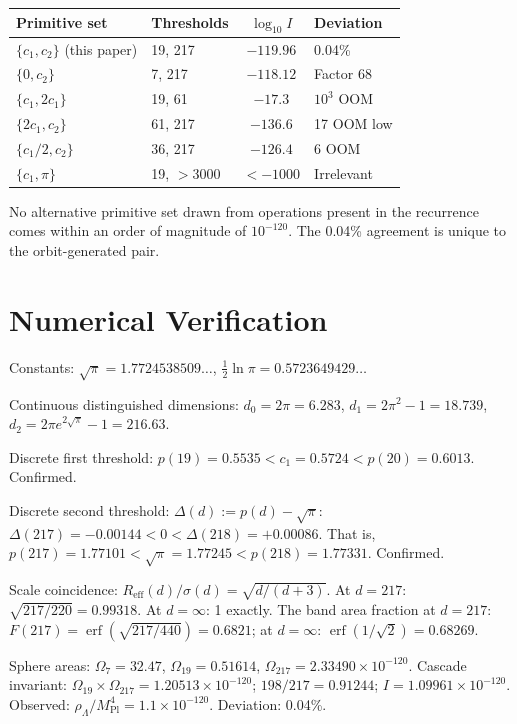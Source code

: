 \documentclass[11pt,a4paper]{article}
\begin{document}
\begin{center}
\begin{tabular}{llcl}
\toprule
Primitive set & Thresholds & $\log_{10} I$ & Deviation\\
\midrule
$\{c_1, c_2\}$ (this paper) & 19, 217 & $-119.96$ & 0.04\%\\
$\{0, c_2\}$ & 7, 217 & $-118.12$ & Factor 68\\
$\{c_1, 2c_1\}$ & 19, 61 & $-17.3$ & $10^3$ OOM\\
$\{2c_1, c_2\}$ & 61, 217 & $-136.6$ & 17 OOM low\\
$\{c_1/2, c_2\}$ & 36, 217 & $-126.4$ & 6 OOM\\
$\{c_1, \pi\}$ & 19, $>$3000 & $<-1000$ & Irrelevant\\
\bottomrule
\end{tabular}
\end{center}

No alternative primitive set drawn from operations present in the recurrence comes within an order of magnitude of $10^{-120}$. The 0.04\% agreement is unique to the orbit-generated pair.

\appendix

\section{Numerical Verification}

Constants: $\sqrt{\pi} = 1.7724538509\ldots$, $\frac{1}{2}\ln\pi = 0.5723649429\ldots$

Continuous distinguished dimensions: $d_0 = 2\pi = 6.283$, $d_1 = 2\pi^2-1 = 18.739$, $d_2 = 2\pi e^{2\sqrt{\pi}}-1 = 216.63$.

Discrete first threshold: $p(19) = 0.5535 < c_1 = 0.5724 < p(20) = 0.6013$. Confirmed.

Discrete second threshold: $\Delta(d) := p(d) - \sqrt{\pi}$: $\Delta(217) = -0.00144 < 0 < \Delta(218) = +0.00086$. That is, $p(217) = 1.77101 < \sqrt{\pi} = 1.77245 < p(218) = 1.77331$. Confirmed.

Scale coincidence: $R_{\mathrm{eff}}(d)/\sigma(d) = \sqrt{d/(d+3)}$. At $d=217$: $\sqrt{217/220} = 0.99318$. At $d=\infty$: 1 exactly. The band area fraction at $d=217$: $F(217) = \operatorname{erf}(\sqrt{217/440}) = 0.6821$; at $d=\infty$: $\operatorname{erf}(1/\sqrt{2}) = 0.68269$.

Sphere areas: $\Omega_7 = 32.47$, $\Omega_{19} = 0.51614$, $\Omega_{217} = 2.33490\times 10^{-120}$. Cascade invariant: $\Omega_{19}\times\Omega_{217} = 1.20513\times 10^{-120}$; $198/217 = 0.91244$; $I = 1.09961\times 10^{-120}$. Observed: $\rho_\Lambda/M^4_{\mathrm{Pl}} = 1.1\times 10^{-120}$. Deviation: 0.04\%.
\end{document}
